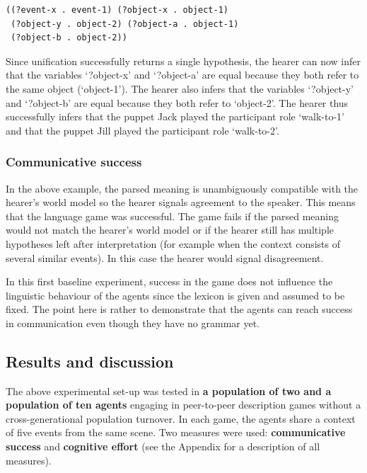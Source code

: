 \ea
\begin{lstlisting}
((?event-x . event-1) (?object-x . object-1)
 (?object-y . object-2) (?object-a . object-1)
 (?object-b . object-2))
\end{lstlisting}
\z

Since unification successfully returns a single hypothesis, the hearer can now infer that the variables `?object-x' and `?object-a' are equal because they both refer to the same object (`object-1'). The hearer also infers that the variables `?object-y' and `?object-b' are equal because they both refer to `object-2'. The hearer thus successfully infers that the puppet Jack played the participant role `walk-to-1' and that the puppet Jill played the participant role `walk-to-2'.


\subsubsection{Communicative success}
 In the above example, the parsed meaning is unambiguously compatible with the hearer's world model so the hearer signals agreement to the speaker. This means that the language game was successful. The game fails if the parsed meaning would not match the hearer's world model or if the hearer still has multiple hypotheses left after interpretation (for example when the context consists of several similar events). In this case the hearer would signal disagreement.

In this first baseline experiment, success in the game does not influence the linguistic behaviour of the agents since the lexicon is given and assumed to be fixed. The point here is rather to demonstrate that the agents can reach success in communication even though they have no grammar yet.

\subsection{Results and discussion}

The above experimental set-up was tested in {\bfseries a population of two and a population of ten agents} engaging in peer-to-peer description games without a cross-generational population turnover. In each game, the agents share a context of five events from the same scene. Two measures were used: {\bfseries communicative success} and {\bfseries cognitive effort} (see the Appendix for a description of all measures).


